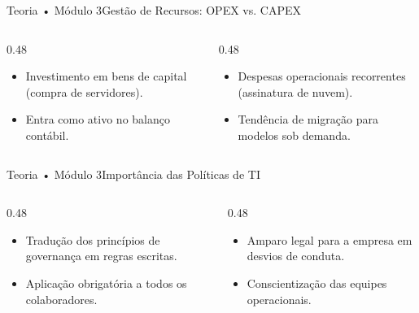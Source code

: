 \begin{senaiframe}{Teoria • Módulo 3}{Gestão de Recursos: OPEX vs. CAPEX}
  \begin{columns}[t]
    \begin{column}{0.48\textwidth}
      \begin{tcolorbox}[senaibluecard, title={CAPEX (Capital Expenditure)}]
        \begin{itemize}
          \item Investimento em bens de capital (compra de servidores).
          \item Entra como ativo no balanço contábil.
        \end{itemize}
      \end{tcolorbox}
    \end{column}
    \begin{column}{0.48\textwidth}
      \begin{tcolorbox}[senaigreencard, title={OPEX (Operational Expenditure)}]
        \begin{itemize}
          \item Despesas operacionais recorrentes (assinatura de nuvem).
          \item Tendência de migração para modelos sob demanda.
        \end{itemize}
      \end{tcolorbox}
    \end{column}
  \end{columns}
\end{senaiframe}

\begin{senaiframe}{Teoria • Módulo 3}{Importância das Políticas de TI}
  \begin{columns}[t]
    \begin{column}{0.48\textwidth}
      \begin{tcolorbox}[senaibluecard, title={Diretrizes Mandatórias}]
        \begin{itemize}
          \item Tradução dos princípios de governança em regras escritas.
          \item Aplicação obrigatória a todos os colaboradores.
        \end{itemize}
      \end{tcolorbox}
    \end{column}
    \begin{column}{0.48\textwidth}
      \begin{tcolorbox}[senaicard, title={Proteção Jurídica}]
        \begin{itemize}
          \item Amparo legal para a empresa em desvios de conduta.
          \item Conscientização das equipes operacionais.
        \end{itemize}
      \end{tcolorbox}
    \end{column}
  \end{columns}
\end{senaiframe}

